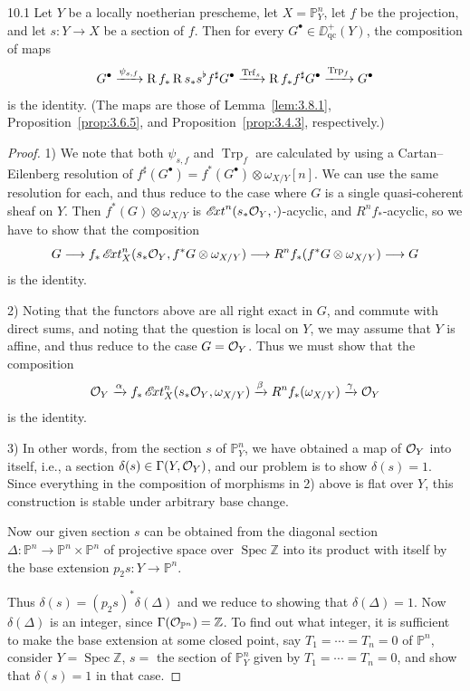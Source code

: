 \begin{bookproposition}{10.1}\label{prop:3.10.1}
Let $Y$ be a locally noetherian prescheme, let $X=\mathbb{P}^n_Y$, let $f$ be the projection, and let $s\colon Y\to X$ be a section of $f$. Then for every $G^\bullet\in\DD_{\mathrm{qc}}^+(Y)$, the composition of maps
\[
G^\bullet \xrightarrow{\psi_{s,f}} \operatorname{R} f_* \operatorname{R} s_* s^{\flat} f^{\sharp} G^\bullet \xrightarrow{\operatorname{Trf}_s} \operatorname{R} f_* f^{\sharp} G^\bullet \xrightarrow{\operatorname{Trp}_f} G^\bullet
\]
is the identity. (The maps are those of Lemma~\ref{lem:3.8.1}, Proposition~\ref{prop:3.6.5}, and Proposition~\ref{prop:3.4.3}, respectively.)
\end{bookproposition}

\begin{proof}
1) We note that both $\psi_{s,f}$ and $\operatorname{Trp}_f$ are calculated by using a Cartan--Eilenberg resolution of $f^{\sharp}(G^\bullet)=f^*(G^\bullet)\otimes\omega_{X/Y}[n]$. We can use the same resolution for each, and thus reduce to the case where $G$ is a single quasi-coherent sheaf on $Y$. Then $f^*(G)\otimes\omega_{X/Y}$ is $\mathop{\mathscr{E}\!xt}\nolimits^n(s_*\mathcal{O}_Y,\cdot)$-acyclic, and $R^n f_*$-acyclic, so we have to show that the composition
\[
G \longrightarrow f_* \mathop{\mathscr{E}\!xt}\nolimits^n_X(s_*\mathcal{O}_Y, f^*G\otimes\omega_{X/Y}) \longrightarrow R^n f_*(f^*G\otimes\omega_{X/Y}) \longrightarrow G
\]
is the identity.

2) Noting that the functors above are all right exact in $G$, and commute with direct sums, and noting that the question is local on $Y$, we may assume that $Y$ is affine, and thus reduce to the case $G=\mathcal{O}_Y$. Thus we must show that the composition
\[
\mathcal{O}_Y \xrightarrow{\alpha} f_* \mathop{\mathscr{E}\!xt}\nolimits^n_X(s_*\mathcal{O}_Y, \omega_{X/Y}) \xrightarrow{\beta} R^n f_*(\omega_{X/Y}) \xrightarrow{\gamma} \mathcal{O}_Y
\]
is the identity.

3) In other words, from the section $s$ of $\mathbb{P}^n_Y$, we have obtained a map of $\mathcal{O}_Y$ into itself, i.e., a section $\delta(s)\in\Gamma(Y,\mathcal{O}_Y)$, and our problem is to show $\delta(s)=1$. Since everything in the composition of morphisms in 2) above is flat over $Y$, this construction is stable under arbitrary base change.

Now our given section $s$ can be obtained from the diagonal section $\Delta\colon \mathbb{P}^n\to\mathbb{P}^n\times\mathbb{P}^n$ of projective space over $\operatorname{Spec}\mathbb{Z}$ into its product with itself by the base extension $p_2 s\colon Y\to\mathbb{P}^n$.

Thus $\delta(s)=(p_2 s)^*\delta(\Delta)$ and we reduce to showing that $\delta(\Delta)=1$. Now $\delta(\Delta)$ is an integer, since $\Gamma(\mathcal{O}_{\mathbb{P}^n})=\mathbb{Z}$. To find out what integer, it is sufficient to make the base extension at some closed point, say $T_1=\cdots=T_n=0$ of $\mathbb{P}^n$, consider $Y=\operatorname{Spec}\mathbb{Z}$, $s=$ the section of $\mathbb{P}^n_Y$ given by $T_1=\cdots=T_n=0$, and show that $\delta(s)=1$ in that case.


\end{proof}

